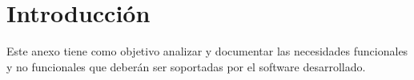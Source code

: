 \label{anex:B}

\section{Introducción}

Este anexo tiene como objetivo analizar y documentar las necesidades funcionales y no funcionales que deberán ser soportadas por el software desarrollado.


